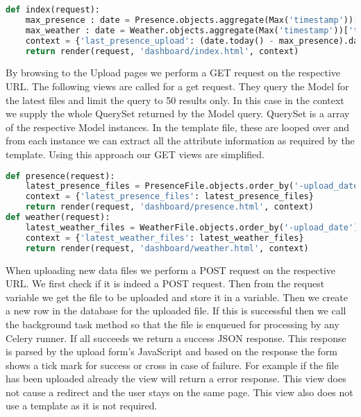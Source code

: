 \begin{lstlisting}[language={Python}]
def index(request):
    max_presence : date = Presence.objects.aggregate(Max('timestamp'))['timestamp__max'].date()
    max_weather : date = Weather.objects.aggregate(Max('timestamp'))['timestamp__max'].date()
    context = {'last_presence_upload': (date.today() - max_presence).days, 'last_weather_upload': (date.today() - max_weather).days}
    return render(request, 'dashboard/index.html', context)
\end{lstlisting}

By browsing to the Upload pages we perform a GET request on the respective URL. The following views are called for a get request.
They query the Model for the latest files and limit the query to 50 results only. In this case in the context we supply the whole
QuerySet returned by the Model query. QuerySet is a array of the respective Model instances. In the template file, these are
looped over and from each instance we can extract all the attribute information as required by the template. Using this approach
our GET views are simplified.

\begin{lstlisting}[language={Python}]
def presence(request):
    latest_presence_files = PresenceFile.objects.order_by('-upload_date')[:50]
    context = {'latest_presence_files': latest_presence_files}
    return render(request, 'dashboard/presence.html', context)
def weather(request):
    latest_weather_files = WeatherFile.objects.order_by('-upload_date')[:50]
    context = {'latest_weather_files': latest_weather_files}
    return render(request, 'dashboard/weather.html', context)
\end{lstlisting}

When uploading new data files we perform a POST request on the respective URL. We first check if it is indeed a POST request.
Then from the request variable we get the file to be uploaded and store it in a variable. Then we create a new row in the database
for the uploaded file. If this is successful then we call the background task method so that the file is enqueued for processing by
any Celery runner. If all succeeds we return a success JSON response. This response is parsed by the upload form's JavaScript and based
on the response the form shows a tick mark for success or cross in case of failure. For example if the file has been uploaded already
the view will return a error response. This view does not cause a redirect and the user stays on the same page. This view also does not use
a template as it is not required.

